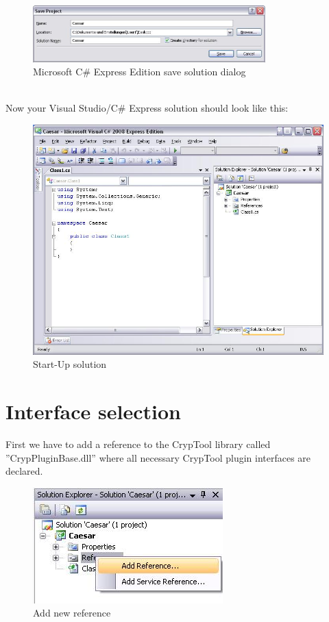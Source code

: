 \begin{figure}[h!]
	\centering
		\includegraphics[width=0.80\textwidth]{figures/save_solution_csharp_express.JPG}
	\caption{Microsoft C\# Express Edition save solution dialog}
	\label{fig:save_solution_csharp_express}
\end{figure}\\
Now your Visual Studio/C\# Express solution should look like this:\\
\begin{figure}[h!]
	\centering
		\includegraphics[width=1.00\textwidth]{figures/solution_start_up.jpg}
	\caption{Start-Up solution}
	\label{fig:solution_start_up}
\end{figure}
\section{Interface selection}
\label{sec:SelectTheInterfaceYourPluginWantsToServe}
First we have to add a reference to the CrypTool library called ''CrypPluginBase.dll'' where all necessary CrypTool plugin interfaces are declared.

\begin{figure}[h!]
	\includegraphics{figures/add_reference.jpg}
	\caption{Add new reference}
	\label{fig:add_reference}
\end{figure}

